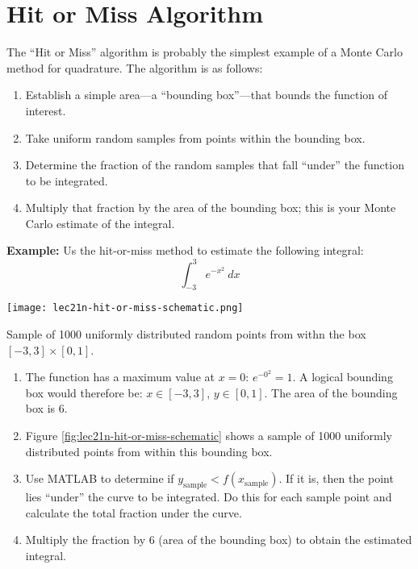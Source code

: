 \section{Hit or Miss Algorithm}
The ``Hit or Miss'' algorithm is probably the simplest example of a Monte Carlo method for quadrature.  The algorithm is as follows:
\begin{enumerate}
\item Establish a simple area---a ``bounding box''---that bounds the function of interest.
\item Take uniform random samples from points within the bounding box.
\item Determine the fraction of the random samples that fall ``under'' the function to be integrated.
\item Multiply that fraction by the area of the bounding box; this is your Monte Carlo estimate of the integral.
\end{enumerate}

\vspace{0.25cm}

\noindent\textbf{Example:} Us the hit-or-miss method to estimate the following integral:
\begin{equation*}
\int_{-3}^{3} e^{-x^2} \ dx
\end{equation*}

\begin{marginfigure}
\texttt{[image: lec21n-hit-or-miss-schematic.png]}
\caption{Sample of 1000 uniformly distributed random points from withn the box $[-3,3]\times[0,1]$.}
\label{fig:lec21n-hit-or-miss-schematic}
\end{marginfigure}

\begin{enumerate}
\item The function has a maximum value at $x=0$: $e^{-0^2} = 1$.  A logical bounding box would therefore be: $x \in [-3,3]$, $y \in [0,1]$.  The area of the bounding box is 6.

\item Figure \ref{fig:lec21n-hit-or-miss-schematic} shows a sample of 1000 uniformly distributed points from within this bounding box.

\item Use MATLAB to determine if $y_{\text{sample}} < f(x_{\text{sample}})$.  If it is, then the point lies ``under'' the curve to be integrated.  Do this for each sample point and calculate the total fraction under the curve.

\item Multiply the fraction by 6 (area of the bounding box) to obtain the estimated integral.
\end{enumerate}

